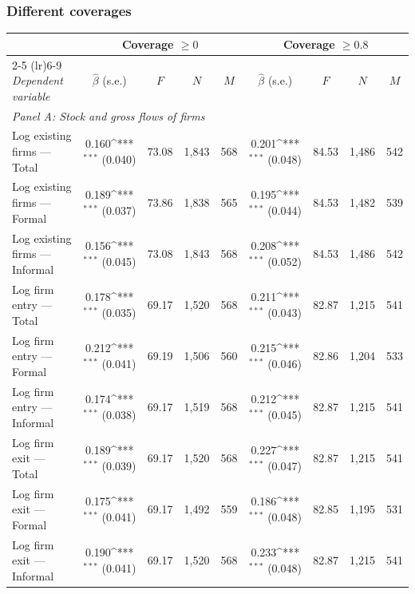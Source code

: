 \documentclass[aspectratio=169]{beamer}
\newcommand{\sym}[1]{\ifmmode^{#1}\else\(^{#1}\)\fi}
\begin{document}

\begin{frame}[noframenumbering]
\frametitle{\textbf{Different coverages}} \label{coverage}

\begin{center}
    \tiny
    \begin{tabular}{lcccccccc}
        \toprule
        & \multicolumn{4}{c}{\textbf{Coverage $\geq 0$}} 
        & \multicolumn{4}{c}{\textbf{Coverage $\geq 0.8$}} \\
        \cmidrule(lr){2-5} \cmidrule(lr){6-9}
        \textit{Dependent variable} 
        & $\hat\beta$ (s.e.) & $F$ & $N$ & $M$
        & $\hat\beta$ (s.e.) & $F$ & $N$ & $M$ \\
        \midrule
        
        \multicolumn{9}{l}{\textit{Panel A: Stock and gross flows of firms}} \\
        Log existing firms --- Total    
        & 0.160\sym{***} (0.040) & 73.08 & 1,843 & 568
        & 0.201\sym{***} (0.048) & 84.53 & 1,486 & 542 \\
        Log existing firms --- Formal   
        & 0.189\sym{***} (0.037) & 73.86 & 1,838 & 565
        & 0.195\sym{***} (0.044) & 84.53 & 1,482 & 539 \\
        Log existing firms --- Informal 
        & 0.156\sym{***} (0.045) & 73.08 & 1,843 & 568
        & 0.208\sym{***} (0.052) & 84.53 & 1,486 & 542 \\
        Log firm entry --- Total        
        & 0.178\sym{***} (0.035) & 69.17 & 1,520 & 568
        & 0.211\sym{***} (0.043) & 82.87 & 1,215 & 541 \\
        Log firm entry --- Formal       
        & 0.212\sym{***} (0.041) & 69.19 & 1,506 & 560
        & 0.215\sym{***} (0.046) & 82.86 & 1,204 & 533 \\
        Log firm entry --- Informal     
        & 0.174\sym{***} (0.038) & 69.17 & 1,519 & 568
        & 0.212\sym{***} (0.045) & 82.87 & 1,215 & 541 \\
        Log firm exit --- Total         
        & 0.189\sym{***} (0.039) & 69.17 & 1,520 & 568
        & 0.227\sym{***} (0.047) & 82.87 & 1,215 & 541 \\
        Log firm exit --- Formal        
        & 0.175\sym{***} (0.041) & 69.17 & 1,492 & 559
        & 0.186\sym{***} (0.048) & 82.85 & 1,195 & 531 \\
        Log firm exit --- Informal      
        & 0.190\sym{***} (0.041) & 69.17 & 1,520 & 568
        & 0.233\sym{***} (0.048) & 82.87 & 1,215 & 541 \\
        

\end{tabular}
\end{center}
\end{frame}
\end{document}
